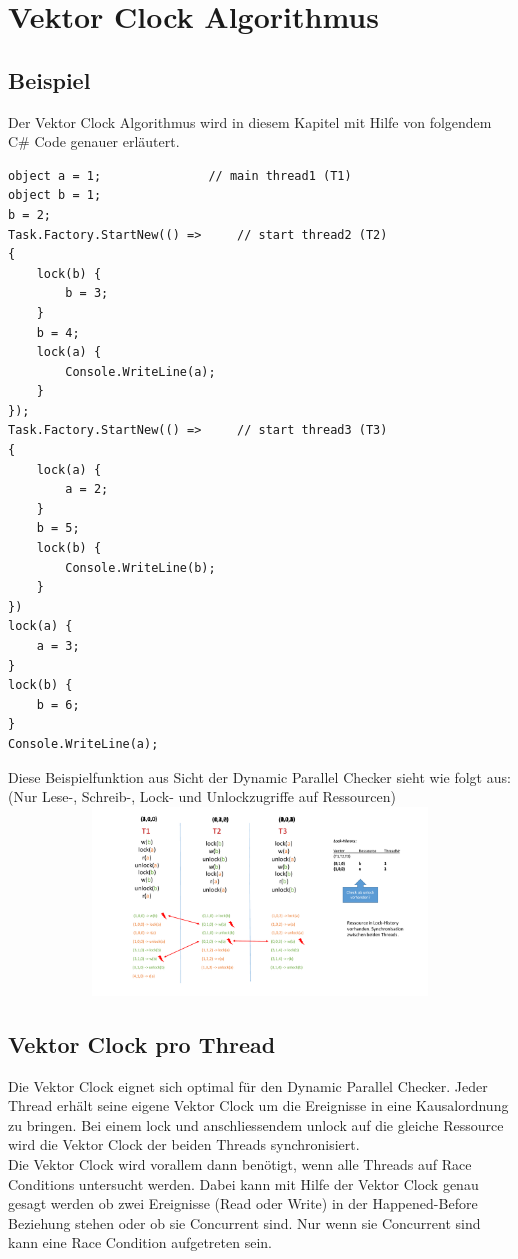 \documentclass[10pt,a4paper]{article}
\begin{document}
\section{Vektor Clock Algorithmus}
\subsection{Beispiel}

\begin{flushleft}
Der Vektor Clock Algorithmus wird in diesem Kapitel mit Hilfe von folgendem C\# Code genauer erläutert.\\
\begin{singlespace}
\begin{lstlisting}
object a = 1;				// main thread1 (T1)
object b = 1;
b = 2;
Task.Factory.StartNew(() =>		// start thread2 (T2)
{
	lock(b) {
		b = 3;
	}
	b = 4;
	lock(a) {
		Console.WriteLine(a);
	}
});
Task.Factory.StartNew(() =>		// start thread3 (T3)
{
	lock(a) {
		a = 2;
	}
	b = 5;
	lock(b) {
		Console.WriteLine(b);
	}
})
lock(a) {
	a = 3;
}
lock(b) {
	b = 6;
}
Console.WriteLine(a);
\end{lstlisting}
\end{singlespace}
\end{flushleft}

\begin{flushleft}
Diese Beispielfunktion aus Sicht der Dynamic Parallel Checker sieht wie folgt aus: (Nur Lese-, Schreib-, Lock- und Unlockzugriffe auf Ressourcen)\\[0.5cm]
	\includegraphics[width=14cm,height=5cm,trim=20mm 90mm 110mm 20mm, clip]{pictures/VectorCheckingAlgorithm.pdf}\\
\end{flushleft}
\subsection{Vektor Clock pro Thread}
\begin{flushleft}
Die Vektor Clock eignet sich optimal für den Dynamic Parallel Checker. Jeder Thread erhält seine eigene Vektor Clock um die Ereignisse in eine Kausalordnung zu bringen. Bei einem lock und anschliessendem unlock auf die gleiche Ressource wird die Vektor Clock der beiden Threads synchronisiert.\\
Die Vektor Clock wird vorallem dann benötigt, wenn alle Threads auf Race Conditions untersucht werden. Dabei kann mit Hilfe der Vektor Clock genau gesagt werden ob zwei Ereignisse (Read oder Write) in der Happened-Before Beziehung stehen oder ob sie Concurrent sind. Nur wenn sie Concurrent sind kann eine Race Condition aufgetreten sein.
\end{flushleft}
\end{document}
